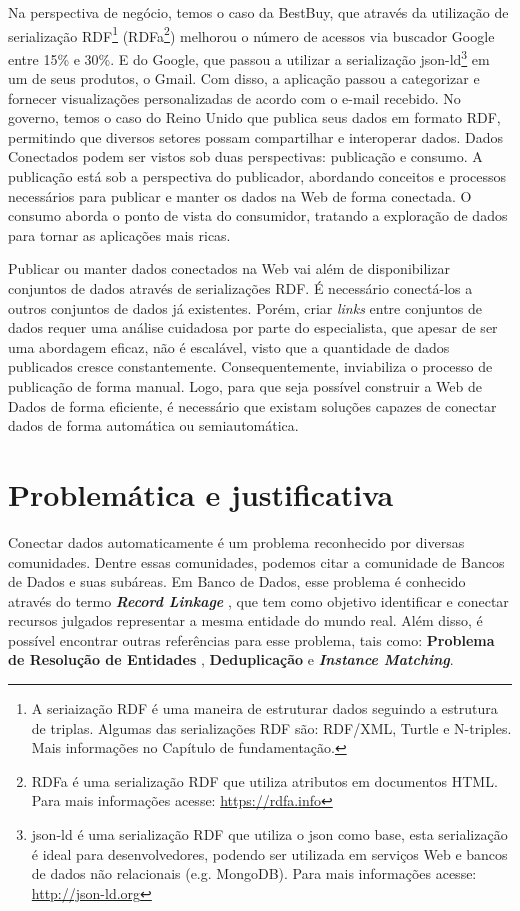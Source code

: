 Na perspectiva de negócio, temos o caso da BestBuy, que através da utilização de serialização RDF\footnote{A seriaização RDF é uma maneira de estruturar dados seguindo a estrutura de triplas. Algumas das serializações RDF são: RDF/XML, Turtle e N-triples. Mais informações no Capítulo de fundamentação.} (RDFa\footnote{RDFa é uma serialização RDF que utiliza atributos em documentos HTML. Para mais informações acesse: \url{https://rdfa.info}}) melhorou o número de acessos via buscador  Google entre 15\% e 30\%. E do Google, que passou a utilizar a serialização json-ld\footnote{json-ld é uma serialização RDF que utiliza o json como base, esta serialização é ideal para desenvolvedores, podendo ser utilizada em serviços Web e bancos de dados não relacionais (e.g. MongoDB). Para mais informações acesse: \url{http://json-ld.org}} em um de seus produtos, o Gmail. Com disso, a aplicação passou a categorizar e fornecer visualizações personalizadas de acordo com o e-mail recebido. No governo, temos o caso do Reino Unido que publica seus dados em formato RDF, permitindo que diversos setores possam compartilhar e interoperar dados.
Dados Conectados podem ser vistos sob duas perspectivas: publicação e consumo. A publicação está sob a perspectiva do publicador, abordando conceitos \cite{berners2006linked, wood2014linked} e processos \cite{bizer2007publish, hyland2011joy, villazon2011methodological, Avila2015} necessários para publicar e manter os dados na Web de forma conectada. O consumo aborda o ponto de vista do consumidor, tratando a exploração de dados para tornar as aplicações mais ricas. 

Publicar ou manter dados conectados na Web vai além de disponibilizar conjuntos de dados através de serializações RDF. É necessário conectá-los a outros conjuntos de dados já existentes. Porém, criar \textit{links} entre conjuntos de dados requer uma análise cuidadosa por parte do especialista, que apesar de ser uma abordagem eficaz, não é escalável, visto que a quantidade de dados publicados cresce constantemente. Consequentemente, inviabiliza o processo de publicação de forma manual. Logo, para que seja possível construir a Web de Dados de forma eficiente, é necessário que existam soluções capazes de conectar dados de forma automática ou semiautomática.

\section{Problemática e justificativa}

Conectar dados automaticamente é um problema reconhecido por diversas comunidades. Dentre essas comunidades, podemos citar a comunidade de Bancos de Dados e suas subáreas. Em Banco de Dados, esse problema é conhecido através do termo \textbf{\textit{Record Linkage}} \cite{gu2003record}, que tem como objetivo identificar e conectar recursos julgados representar a mesma entidade do mundo real.  Além disso, é possível encontrar outras referências para esse problema, tais como: \textbf{Problema de Resolução de Entidades} \cite{menestrina2005generic},  \textbf{Deduplicação} \cite{sarawagi2002interactive} e \textbf{\textit{Instance Matching}}.

